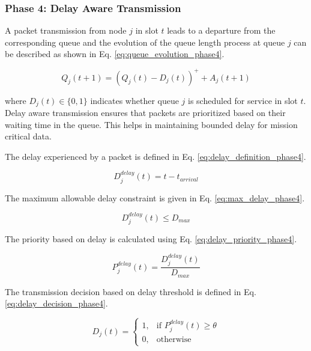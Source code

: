 \documentclass[a4paper,fleqn]{cas-dc}
\numberwithin{equation}{section}
\begin{document}
\subsubsection{Phase 4: Delay Aware Transmission}

A packet transmission from node $j$ in slot $t$ leads to a departure from the corresponding queue and the evolution of the queue length process at queue $j$ can be described as shown in Eq. \ref{eq:queue_evolution_phase4}.

\begin{equation}
Q_j(t+1) = (Q_j(t) - D_j(t))^+ + A_j(t+1)
\label{eq:queue_evolution_phase4}
\end{equation}

where $D_j(t)\in\{0,1\}$ indicates whether queue $j$ is scheduled for service in slot $t$. Delay aware transmission ensures that packets are prioritized based on their waiting time in the queue. This helps in maintaining bounded delay for mission critical data.

The delay experienced by a packet is defined in Eq. \ref{eq:delay_definition_phase4}.

\begin{equation}
D_j^{delay}(t) = t - t_{arrival}
\label{eq:delay_definition_phase4}
\end{equation}

The maximum allowable delay constraint is given in Eq. \ref{eq:max_delay_phase4}.

\begin{equation}
D_j^{delay}(t) \leq D_{max}
\label{eq:max_delay_phase4}
\end{equation}

The priority based on delay is calculated using Eq. \ref{eq:delay_priority_phase4}.

\begin{equation}
P_j^{delay}(t) = \frac{D_j^{delay}(t)}{D_{max}}
\label{eq:delay_priority_phase4}
\end{equation}

The transmission decision based on delay threshold is defined in Eq. \ref{eq:delay_decision_phase4}.

\begin{equation}
D_j(t) =
\begin{cases}
1, & \text{if } P_j^{delay}(t) \geq \theta \\
0, & \text{otherwise}
\end{cases}
\label{eq:delay_decision_phase4}
\end{equation}
\end{document}
